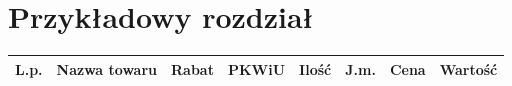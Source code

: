 \documentclass{article}
\begin{document}
\section{Przykładowy rozdział}
\begin{table}[]
\begin{tabular}{|c|l|l|l|l|l|l|l|}
\hline
\textbf{L.p.} & \textbf{Nazwa towaru} & \textbf{Rabat} & \textbf{PKWiU} & \textbf{Ilość} & \textbf{J.m.} & \textbf{Cena} & \textbf{Wartość} \\ \hline
\end{tabular}
\end{table}
\end{document}
